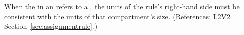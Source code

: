 When the  in an \AssignmentRule refers to a \Compartment,
the units of the rule's right-hand side must be consistent with the units
of that compartment's size.  (References: L2V2
Section~\ref{sec:assignmentrule}.)

